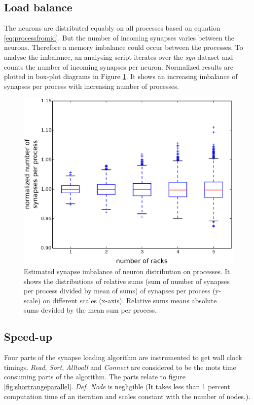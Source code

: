 \subsection{Load balance}
The neurons are distributed equably on all processes based on equation \ref{eq:processfromid}.
But the number of incoming synapses varies between the neurons.
Therefore a memory imbalance could occur between the processes.
To analyse the imbalance, an analysing script iterates over the \emph{syn} dataset and counts
the number of incoming synapses per neuron. Normalized results are plotted in box-plot diagrams 
in Figure \ref{fullcircuitdist}.
It shows an increasing imbalance of synapses per process with increasing number of processes.
\begin{figure}[ht!]
\centering
\includegraphics[scale=0.4]{pictures/full_circuit_rack_distribution.eps}
\caption{Estimated synapse imbalance of neuron distribution on processes.
It shows the distributions of relative sums (sum of number of synapses per process divided by mean of sums) of synapses per process (y-scale) on different scales (x-axis). Relative sums means absolute sums devided by the mean sum per process. }
\label{fullcircuitdist}
\end{figure}

\subsection{Speed-up}
Four parts of the synapse loading algorithm are instrumented to get wall clock timings.
\emph{Read}, \emph{Sort}, \emph{Alltoall} and \emph{Connect} are considered to be the mots time
consuming parts of the algorithm. The parts relate to figure \ref{fig:shortrangeparallel}.
\emph{Def. Node} is negligible (It takes less than 1 percent computation time of an iteration and scales constant with the number of nodes.).


